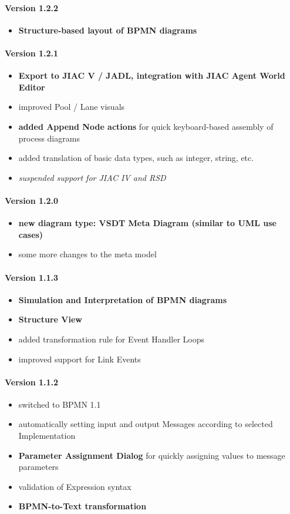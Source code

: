 \paragraph{Version 1.2.2}
\begin{itemize}
	\item \textbf{Structure-based layout of BPMN diagrams}
\end{itemize}

\paragraph{Version 1.2.1}
\begin{itemize}
	\item \textbf{Export to JIAC V / JADL, integration with JIAC Agent World Editor}
	\item improved Pool / Lane visuals
	\item \textbf{added Append Node actions} for quick keyboard-based assembly of process diagrams
	\item added translation of basic data types, such as integer, string, etc.
	\item \textit{suspended support for JIAC IV and RSD}
\end{itemize}

\paragraph{Version 1.2.0}
\begin{itemize}
	\item \textbf{new diagram type: VSDT Meta Diagram (similar to UML use cases)}
	\item some more changes to the meta model
\end{itemize}

\paragraph{Version 1.1.3}
\begin{itemize}
	\item \textbf{Simulation and Interpretation of BPMN diagrams}
	\item \textbf{Structure View}
	\item added transformation rule for Event Handler Loops
	\item improved support for Link Events
\end{itemize}

\paragraph{Version 1.1.2}
\begin{itemize}
	\item switched to BPMN 1.1
	\item automatically setting input and output Messages according to selected Implementation
	\item \textbf{Parameter Assignment Dialog} for quickly assigning values to message parameters
	\item validation of Expression syntax
	\item \textbf{BPMN-to-Text transformation}
\end{itemize}

